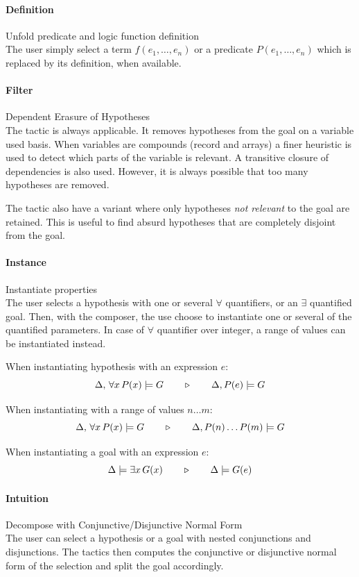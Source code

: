 \paragraph{Definition} Unfold predicate and logic function definition\\
The user simply select a term $f(e_1,\ldots,e_n)$ or a predicate $P(e_1,\ldots,e_n)$ which is replaced by its definition, when available.

\paragraph{Filter} Dependent Erasure of Hypotheses \\
The tactic is always applicable. It removes hypotheses from the goal on a
variable used basis. When variables are compounds (record and arrays) a finer
heuristic is used to detect which parts of the variable is relevant. A
transitive closure of dependencies is also used. However, it is always
possible that too many hypotheses are removed.

The tactic also have a variant where only hypotheses \emph{not relevant} to the
goal are retained. This is useful to find absurd hypotheses that are completely
disjoint from the goal.

\paragraph{Instance} Instantiate properties\\
The user selects a hypothesis with one or several $\forall$ quantifiers, or an $\exists$ quantified goal. Then, with the composer, the use choose to instantiate one or several of the quantified parameters. In case of $\forall$ quantifier over integer, a range of values can be instantiated instead.

When instantiating hypothesis with an expression $e$:
$$\Delta,\,\forall x\, P(x)\models G\quad\quad\triangleright\quad\quad\Delta,P(e)\models G$$

When instantiating with a range of values $n\ldots m$:
$$\Delta,\,\forall x\, P(x)\models G\quad\quad\triangleright\quad\quad\Delta,P(n)\ldots P(m)\models G$$

When instantiating a goal with an expression $e$:
$$\Delta\models \exists x\,G(x)\quad\quad\triangleright\quad\quad\Delta\models G(e)$$

\paragraph{Intuition} Decompose with Conjunctive/Disjunctive Normal Form\\
The user can select a hypothesis or a goal with nested conjunctions and disjunctions. The tactics then computes the conjunctive or disjunctive normal form of the selection and split the goal accordingly.

